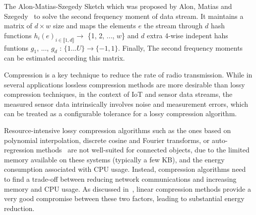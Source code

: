 The Alon-Matias-Szegedy Sketch which was proposed by Alon, Matias and
Szegedy~\cite{alon1999space} to solve the second frequency moment of data
stream. It maintains a matrix of $d\times{w}$ size and maps the elements $e$ the
stream through $d$ hash functions $h_{i}(e)_{i\in \llbracket 1, d \rrbracket}
\rightarrow$ \{1, 2, ..., $w$\} and $d$ extra 4-wise indepent hahs funtions
$g_1$, ..., $g_d$ : $\{1...U\}\rightarrow \{-1, 1\}$. Finally, The second
frequency moments can be estimated according this matrix.
    







% 
%


% 




Compression is a key technique to reduce the rate of radio 
transmission.  While in several applications lossless compression 
methods are more desirable than lossy compression techniques, in the 
context of IoT and sensor data streams, the measured sensor data 
intrinsically involves noise and measurement errors, which can 
be treated as a configurable tolerance for a lossy compression algorithm. 

Resource-intensive lossy compression algorithms such as the ones based on 
polynomial interpolation, discrete cosine and Fourier transforms, or 
auto-regression methods~\cite{lu2010optimized} are not well-suited for 
connected objects, due to the limited memory available on 
these systems (typically a few KB), and the energy consumption 
associated with CPU usage. Instead, compression algorithms need 
to find a trade-off between reducing network communications and 
increasing memory and CPU usage. As 
discussed in~\cite{zordan2014performance}, linear compression methods 
provide a very good compromise between these two factors, leading to 
substantial energy reduction.
